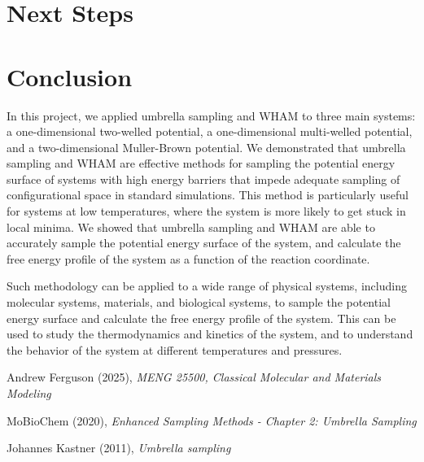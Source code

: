 \documentclass{article}
\begin{document}
\section{Next Steps}

\section{Conclusion}

In this project, we applied umbrella sampling and WHAM to three main systems: a one-dimensional two-welled potential, a one-dimensional multi-welled potential, and a two-dimensional Muller-Brown potential. We demonstrated that umbrella sampling and WHAM are effective methods for sampling the potential energy surface of systems with high energy barriers that impede adequate sampling of configurational space in standard simulations. This method is particularly useful for systems at low temperatures, where the system is more likely to get stuck in local minima. We showed that umbrella sampling and WHAM are able to accurately sample the potential energy surface of the system, and calculate the free energy profile of the system as a function of the reaction coordinate.

Such methodology can be applied to a wide range of physical systems, including molecular systems, materials, and biological systems, to sample the potential energy surface and calculate the free energy profile of the system. This can be used to study the thermodynamics and kinetics of the system, and to understand the behavior of the system at different temperatures and pressures.


\begin{thebibliography}{9}

Andrew Ferguson (2025), \emph{MENG 25500, Classical Molecular and Materials Modeling}

MoBioChem (2020), \emph{Enhanced Sampling Methods - Chapter 2: Umbrella Sampling}

Johannes Kastner (2011), \emph{Umbrella sampling}

\end{thebibliography}
\end{document}
